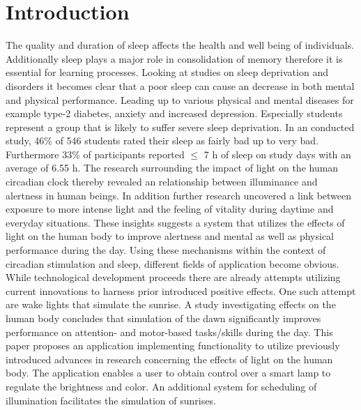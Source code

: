 \documentclass[conference]{IEEEtran}
\begin{document}
\section{Introduction}
The quality and duration of sleep affects the health and well being of individuals.
Additionally sleep plays a major role in consolidation of memory \cite{Rauchs2005} therefore it is essential for learning processes.
Looking at studies on sleep deprivation and disorders it becomes clear that a poor sleep can cause an decrease in both
mental and physical performance. \cite{Mirghani2015a, Antunes2017a} Leading up to various physical and mental
diseases for example type-2 diabetes, anxiety and increased depression. Especially students represent a group that
is likely to suffer severe sleep deprivation. In an conducted study, 46\% of 546 students rated their sleep as fairly bad up to
very bad. Furthermore 33\% of participants reported $\leq$ 7 h of sleep on study days with an average of 6.55 h. \cite{Norbury2019a}
The research surrounding the impact of light on the human circadian clock thereby revealed an relationship between illuminance and
alertness in human beings. \cite{DuffyJeanne2009a} In addition further research uncovered a link between exposure to more intense
light and the feeling of vitality during daytime and everyday situations. \cite{Smolders2014a}
These insights suggests a system that utilizes the effects of light on the human body to improve alertness and mental as well as
physical performance during the day. Using these mechanisms within the context of circadian stimulation and sleep, different
fields of application become obvious.
While technological development proceeds there are already attempts utilizing current innovations to harness prior introduced
positive effects. One such attempt are wake lights that simulate the sunrise. A study investigating effects on the human body
concludes that simulation of the dawn significantly improves performance on attention- and motor-based tasks/skills during the day.
\cite{Gabel2015a}
This paper proposes an application implementing functionality to utilize previously introduced advances in research
concerning the effects of light on the human body. The application enables a user to obtain control over a smart lamp
to regulate the brightness and color. An additional system for scheduling of illumination facilitates the simulation of sunrises.
\end{document}
